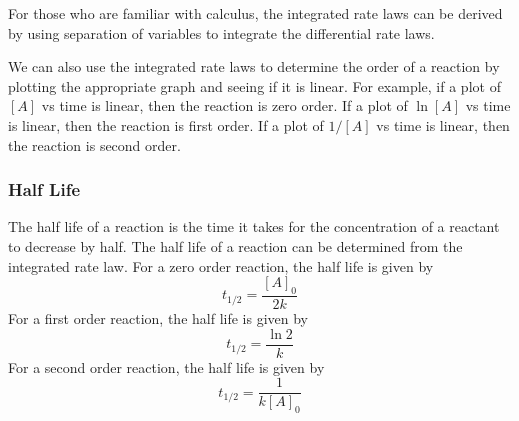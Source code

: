 For those who are familiar with calculus, the integrated rate laws can be derived by using separation of variables to integrate the differential rate laws. 

We can also use the integrated rate laws to determine the order of a reaction by plotting the appropriate graph and seeing if it is linear. For example, if a plot of $[A]$ vs time is linear, then the reaction is zero order. If a plot of $\ln{[A]}$ vs time is linear, then the reaction is first order. If a plot of $1/[A]$ vs time is linear, then the reaction is second order.
\subsubsection{Half Life}
The half life of a reaction is the time it takes for the concentration of a reactant to decrease by half. The half life of a reaction can be determined from the integrated rate law. For a zero order reaction, the half life is given by
\begin{equation}\label{eq:halfLifeZero}
    t_{1/2} = \frac{[A]_0}{2k}
\end{equation}
For a first order reaction, the half life is given by
\begin{equation}\label{eq:halfLifeFirst}
    t_{1/2} = \frac{\ln{2}}{k}
\end{equation}
For a second order reaction, the half life is given by
\begin{equation}\label{eq:halfLifeSecond}
    t_{1/2} = \frac{1}{k[A]_0}
\end{equation}
